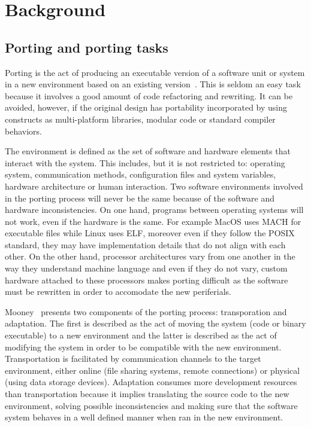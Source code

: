 \section{Background} \label{sec:background}

\subsection{Porting and porting tasks}

Porting is the act of producing an executable version of a software unit or
system in a new environment based on an existing version~\cite{b7}. This is
seldom an easy task because it involves a good amount of code refactoring and
rewriting. It can be avoided, however, if the original design has portability
incorporated by using constructs as multi-platform libraries, modular code or
standard compiler behaviors.

The environment is defined as the set of software and hardware elements that
interact with the system. This includes, but it is not restricted to: operating
system, communication methods, configuration files and system variables,
hardware architecture or human interaction. Two software environments involved
in the porting process will never be the same because of the software and
hardware inconsistencies. On one hand, programs between operating systems will
not work, even if the hardware is the same. For example MacOS uses MACH for
executable files while Linux uses ELF, moreover even if they follow the POSIX
standard, they may have implementation details that do not align with each
other. On the other hand, processor architectures vary from one another in the
way they understand machine language and even if they do not vary, custom
hardware attached to these processors makes porting difficult as the software
must be rewritten in order to accomodate the new periferials.

Mooney~\cite{b7} presents two components of the porting process:
transporation and adaptation. The first is described as the act of moving the
system (code or binary executable) to a new environment and the latter is
described as the act of modifying the system in order to be compatible with the
new environment. Transportation is facilitated by communication channels to the
target environment, either online (file sharing systems, remote connections) or
physical (using data storage devices). Adaptation consumes more development
resources than transportation because it implies translating the source code to
the new environment, solving possible inconsistencies and making sure that the
software system behaves in a well defined manner when ran in the new
environment.

